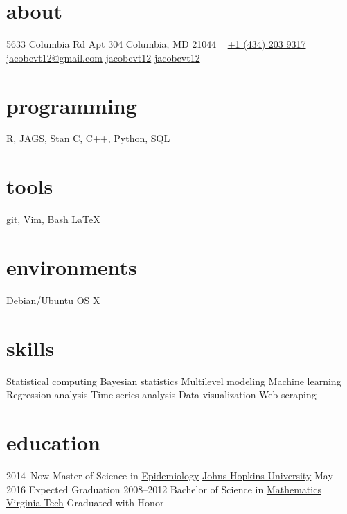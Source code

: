 \documentclass[]{friggeri-cv} %
\begin{document}



\begin{aside} %
\section{about}
5633 Columbia Rd
Apt 304
Columbia, MD 21044
~
\href{tel:14342039317}{\faPhone +1 (434) 203 9317}
\href{mailto:jacobcvt12@gmail.com}{\faEnvelope  jacobcvt12@gmail.com}
\href{https://github.com/jacobcvt12}{\faGithub jacobcvt12}
\href{https://www.linkedin.com/in/jacobcvt12}{\faLinkedin jacobcvt12}
\section{programming}
R, JAGS, Stan
C, C++, 
Python, SQL
\section{tools}
git, Vim, Bash
\LaTeX
\section{environments}
Debian/Ubuntu
OS X
\section{skills}
Statistical computing
Bayesian statistics
Multilevel modeling
Machine learning
Regression analysis
Time series analysis
Data visualization
Web scraping
\end{aside}


\section{education}

\begin{entrylist}
\entry
{2014--Now}
{Master {\normalfont of Science in}
\href{http://www.jhsph.edu/departments/epidemiology/}{Epidemiology}}
{\href{http://www.jhu.edu}{Johns Hopkins University}}
{May 2016 Expected Graduation}
\entry
{2008--2012}
{Bachelor {\normalfont of Science in}
\href{https://www.math.vt.edu/}{Mathematics}}
{\href{http://www.vt.edu}{Virginia Tech}}
{Graduated with Honor}
\end{entrylist}
\end{document}
